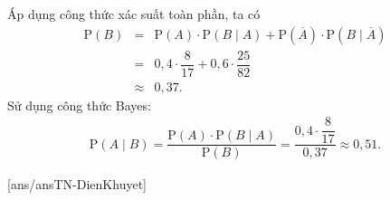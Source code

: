 \begin{ex}
{\begin{itemchoice}
			Áp dụng công thức xác suất toàn phần, ta có
			\allowdisplaybreaks
			\begin{eqnarray*}
				\mathrm{P}(B) &=& \mathrm{P}(A) \cdot \mathrm{P}(B\mid A) + \mathrm{P}\left(\overline{A}\right) \cdot \mathrm{P}\left(B\mid\overline{A}\right) \\
				&=& 0{,}4 \cdot \dfrac{8}{17} + 0{,}6 \cdot \dfrac{25}{82} \\
				&\approx& 0{,}37.
			\end{eqnarray*}
			\itemch Sử dụng công thức Bayes:
			\allowdisplaybreaks
			\begin{eqnarray*}
				\mathrm{P}(A\mid B) = \dfrac{\mathrm{P}(A) \cdot \mathrm{P}(B\mid A)}{\mathrm{P}(B)}
				= \dfrac{0{,}4\cdot \dfrac{8}{17}}{0{,}37}\approx 0{,}51.
			\end{eqnarray*}
		\end{itemchoice}
	}
\end{ex}
\caukq
{}[ans/ansTN-DienKhuyet]
